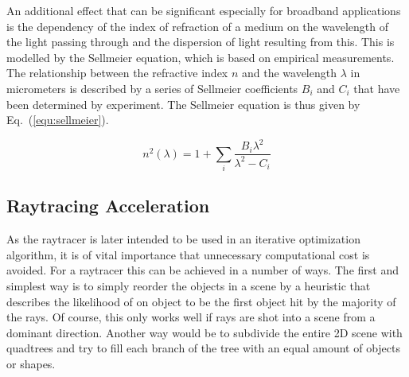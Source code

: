 \documentclass[a4paper,10pt]{article}
\newcommand{\equref}[1]{Eq.~(\ref{#1})}
\begin{document}
    An additional effect that can be significant especially for broadband
    applications is the dependency of the index of refraction of a medium
    on the wavelength of the light passing through and the dispersion
    of light resulting from this.
    This is modelled by the Sellmeier equation, which is based on 
    empirical measurements.
    The relationship between the refractive index $n$ and the wavelength 
    $\lambda$ in micrometers is described by a series of Sellmeier coefficients $B_i$ and
    $C_i$ that have been determined by experiment.
    The Sellmeier equation is thus given by \equref{equ:sellmeier}.

    \begin{equation}
        \label{equ:sellmeier}
        n^2(\lambda) = 1 + \sum_i \frac{B_i \lambda^2}{\lambda^2 - C_i}
    \end{equation}

    \subsection{Raytracing Acceleration} \label{sec:raytracing_acceleration}

    As the raytracer is later intended to be used in an iterative optimization
    algorithm, it is of vital importance that unnecessary computational cost 
    is avoided.
    For a raytracer this can be achieved in a number of ways.
    The first and simplest way is to simply reorder the objects in a scene
    by a heuristic that describes the likelihood of on object to be the
    first object hit by the majority of the rays.
    Of course, this only works well if rays are shot into a scene from
    a dominant direction.
    Another way would be to subdivide the entire 2D scene with quadtrees
    and try to fill each branch of the tree with an equal amount of 
    objects or shapes.
    
\end{document}
